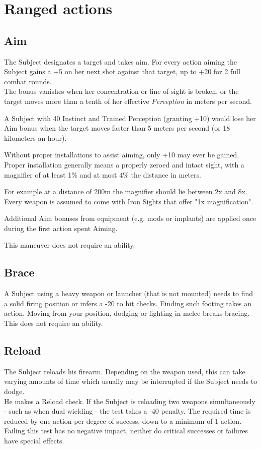 \section{Ranged actions}
\subsection*{Aim}
The Subject designates a target and takes aim.
For every action aiming the Subject
	gains a +5 on her next shot against that target,
	up to +20 for 2 full combat rounds.\\
The bonus vanishes when her concentration or line of sight is broken,
	or the target moves more than a tenth of her effective \emph{Perception} in meters per second.
\par
\begin{exampleblock}
	A Subject with 40 Instinct
		and Trained Perception (granting +10)
		would lose her Aim bonus when the target moves faster than
		5 meters per second
		(or 18 kilometers an hour).
\end{exampleblock}
Without proper installations to assist aiming, only +10 may ever be gained.
Proper installation generally means
	a properly zeroed and intact sight,
	with a magnifier of
	at least 1\%
	and at most 4\%
	the distance in meters.\\
\begin{exampleblock}
	For example at a distance of 200m the magnifier should lie between
		2x and 8x.
	\\%
	Every weapon is assumed to come with Iron Sights that offer "1x magnification".
\end{exampleblock}
Additional Aim bonuses from equipment (e.g. mods or implants) are applied
once during the first action spent Aiming.
\par
This maneuver does not require an ability.
\subsection*{Brace}
A Subject using a heavy weapon or launcher (that is not mounted)
	needs to find a solid firing position or infers a -20 to hit checks.
Finding such footing takes an action.
Moving from your position, dodging or fighting in melee breaks bracing.
This does not require an ability.
\subsection*{Reload}
The Subject reloads his firearm.
Depending on the weapon used, this can take varying amounts of time
	which usually may be interrupted if the Subject needs to dodge.
\\%
He makes a Reload check.
If the Subject is reloading two weapons simultaneously
	- such as when dual wielding -
	the test takes a -40 penalty.
The required time is reduced by one action per degree of success,
	down to a minimum of 1 action.\\
Failing this test has no negative impact, neither do critical successes or failures have special effects.
